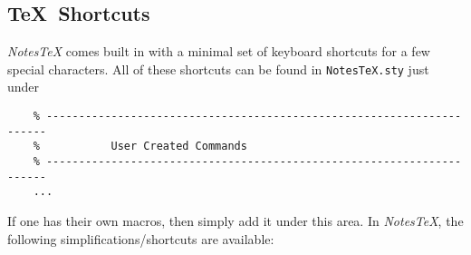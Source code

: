 \documentclass[10pt]{article}
\begin{document}
	\subsection{\TeX\ Shortcuts}
	\textit{NotesTeX} comes built in with a minimal set of keyboard shortcuts for a few special characters. All of these shortcuts can be found in \texttt{NotesTeX.sty} just under
	\begin{verbatim}
	% ----------------------------------------------------------------------
	%           User Created Commands
	% ----------------------------------------------------------------------
	...
	\end{verbatim}
	If one has their own macros, then simply add it under this area. In \textit{NotesTeX}, the following simplifications/shortcuts are available:
\end{document}
